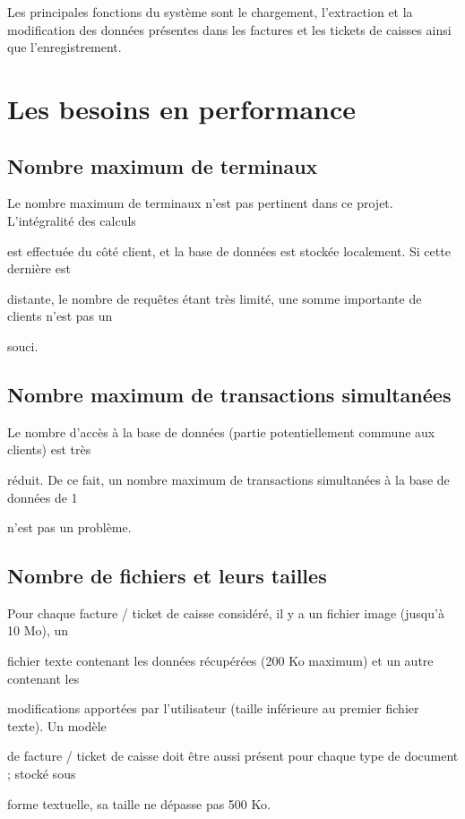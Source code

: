 \documentclass[a4paper,10pt]{article}
\begin{document}
Les principales fonctions du système sont le chargement, l'extraction et la modification des données présentes dans les factures et les tickets de caisses ainsi que l'enregistrement.


\section{Les besoins en performance}

\subsection{Nombre maximum de terminaux}

Le nombre maximum de terminaux n’est pas pertinent dans ce projet. L’intégralité des calculs 

est effectuée du côté client, et la base de données est stockée localement. Si cette dernière est 

distante, le nombre de requêtes étant très limité, une somme importante de clients n’est pas un 

souci.

\subsection{Nombre maximum de transactions simultanées}

Le nombre d’accès à la base de données (partie potentiellement commune aux clients) est très 

réduit. De ce fait, un nombre maximum de transactions simultanées à la base de données de 1 

n’est pas un problème.

\subsection{Nombre de fichiers et leurs tailles}

Pour chaque facture / ticket de caisse considéré, il y a un fichier image (jusqu’à 10 Mo), un 

fichier texte contenant les données récupérées (200 Ko maximum) et un autre contenant les 

modifications apportées par l’utilisateur (taille inférieure au premier fichier texte). Un modèle 

de facture / ticket de caisse doit être aussi présent pour chaque type de document ; stocké sous 

forme textuelle, sa taille ne dépasse pas 500 Ko.
\end{document}
